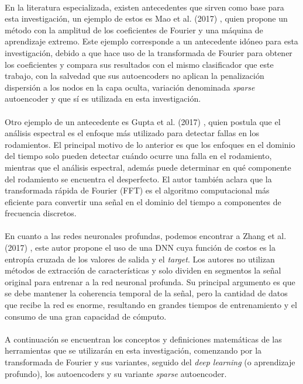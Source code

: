 \documentclass[a4paper,12pt]{article}
\begin{document}
\paragraph{}
En la literatura especializada, existen antecedentes que sirven como base para esta investigación, un ejemplo de estos es Mao et al. (2017) \cite{mao}, quien propone un método con la amplitud de los coeficientes de Fourier y una máquina de aprendizaje extremo. Este ejemplo corresponde a un antecedente idóneo para esta investigación, debido a que hace uso de la transformada de Fourier para obtener los coeficientes y compara sus resultados con el mismo clasificador que este trabajo, con la salvedad que sus autoencoders no aplican la penalización dispersión a los nodos en la capa oculta, variación denominada \textit{sparse} autoencoder y que sí es utilizada en esta investigación.

\paragraph{}
Otro ejemplo de un antecedente es Gupta et al. (2017) \cite{kanpaj}, quien postula que el análisis espectral es el enfoque más utilizado para detectar fallas en los rodamientos. El principal motivo de lo anterior es que los enfoques en el dominio del tiempo solo pueden detectar cuándo ocurre una falla en el rodamiento, mientras que el análisis espectral, además puede determinar en qué componente del rodamiento se encuentra el desperfecto. El autor también aclara que la transformada rápida de Fourier (FFT) es el algoritmo computacional más eficiente para convertir una señal en el dominio del tiempo a componentes de frecuencia discretos.

\paragraph{}
En cuanto a las redes neuronales profundas, podemos encontrar a Zhang et al. (2017) \cite{ran}, este autor propone el uso de una DNN cuya función de costos es la entropía cruzada de los valores de salida y el \textit{target}. Los autores no utilizan métodos de extracción de características y solo dividen en segmentos la señal original para entrenar a la red neuronal profunda. Su principal argumento es que se debe mantener la coherencia temporal de la señal, pero la cantidad de datos que recibe la red es enorme, resultando en grandes tiempos de entrenamiento y el consumo de una gran capacidad de cómputo.

\paragraph{}
A continuación se encuentran los conceptos y definiciones matemáticas de las herramientas que se utilizarán en esta investigación, comenzando por la transformada de Fourier y sus variantes, seguido del \textit{deep learning} (o aprendizaje profundo), los autoencoders y su variante \textit{sparse} autoencoder.
\end{document}
